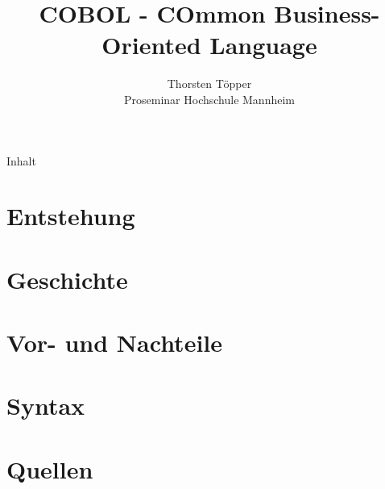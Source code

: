 \documentclass[mode=print,paper=screen,size=11pt,style=simple]{powerdot}
\author{Thorsten T\"{o}pper\\
	Proseminar Hochschule Mannheim}
\title{COBOL - COmmon Business-Oriented Language}
\begin{document}
\maketitle
\begin{slide}{Inhalt}
  \tableofcontents[content=sections]
\end{slide}


\section{Entstehung}



\section{Geschichte}



\section{Vor- und Nachteile}


\section{Syntax}



\section{Quellen}

\end{document}
